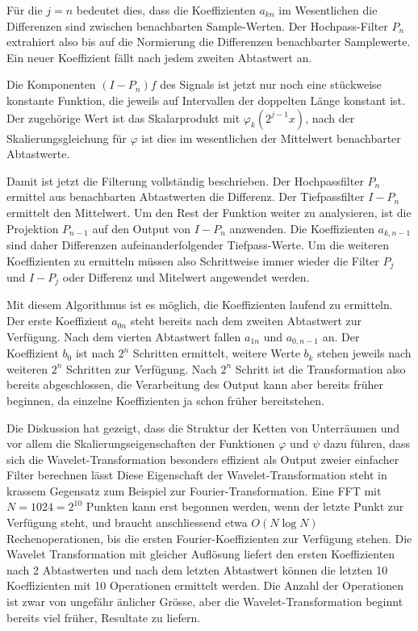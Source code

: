 Für die $j=n$ bedeutet dies, dass die Koeffizienten $a_{kn}$ im Wesentlichen
die Differenzen sind zwischen benachbarten Sample-Werten.
Der Hochpass-Filter $P_n$ extrahiert also bis auf die Normierung
die Differenzen benachbarter Samplewerte.
Ein neuer Koeffizient fällt nach jedem zweiten Abtastwert an.

Die Komponenten $(I-P_n)f$ des Signals ist jetzt nur noch eine stückweise
konstante Funktion, die jeweils auf Intervallen der doppelten Länge konstant
ist.
Der zugehörige Wert ist das Skalarprodukt mit $\varphi_k(2^{j-1}x)$, nach
der Skalierungsgleichung für $\varphi$ ist dies im wesentlichen der
Mittelwert benachbarter Abtastwerte.

Damit ist jetzt die Filterung vollständig beschrieben.
Der Hochpassfilter $P_n$ ermittel aus benachbarten Abtastwerten die
Differenz.
Der Tiefpassfilter $I-P_n$ ermittelt den Mittelwert.
Um den Rest der Funktion weiter zu analysieren, ist die Projektion $P_{n-1}$
auf den Output von $I-P_n$ anzwenden.
Die Koeffizienten $a_{k,n-1}$ sind daher Differenzen aufeinanderfolgender
Tiefpass-Werte.
Um die weiteren Koeffizienten zu ermitteln müssen also Schrittweise
immer wieder die Filter $P_j$ und $I-P_j$ oder Differenz und Mitelwert
angewendet werden.

Mit diesem Algorithmus ist es möglich, die Koeffizienten laufend zu ermitteln.
Der erste Koeffizient $a_{0n}$ steht bereits nach dem zweiten Abtastwert zur
Verfügung.
Nach dem vierten Abtastwert fallen $a_{1n}$ und $a_{0,n-1}$ an.
Der Koeffizient $b_0$ ist nach $2^n$ Schritten ermittelt, weitere
Werte $b_k$ stehen jeweils nach weiteren $2^n$ Schritten zur Verfügung.
Nach $2^n$ Schritt ist die Transformation also bereits abgeschlossen,
die Verarbeitung des Output kann aber bereits früher beginnen, da einzelne
Koeffizienten ja schon früher bereitstehen.

Die Diskussion hat gezeigt, dass die Struktur der Ketten von Unterräumen
und vor allem die Skalierungseigenschaften der Funktionen $\varphi$ und $\psi$
dazu führen, dass sich die Wavelet-Transformation besonders effizient
als Output zweier einfacher Filter berechnen lässt
Diese Eigenschaft der Wavelet-Transformation steht in krassem Gegensatz
zum Beispiel zur Fourier-Transformation.
Eine FFT mit $N=1024=2^{10}$ Punkten kann erst begonnen werden, wenn der
letzte Punkt zur Verfügung steht, und braucht anschliessend etwa
$O(N\log N)$ Rechenoperationen, bis die ersten Fourier-Koeffizienten zur
Verfügung stehen.
Die Wavelet Transformation mit gleicher Auflösung liefert den ersten Koeffizienten nach 2 Abtastwerten und nach dem letzten Abtastwert können die letzten 10
Koeffizienten mit 10 Operationen ermittelt werden.
Die Anzahl der Operationen ist zwar von ungefähr änlicher Grösse, aber
die Wavelet-Transformation beginnt bereits viel früher, Resultate zu
liefern.

